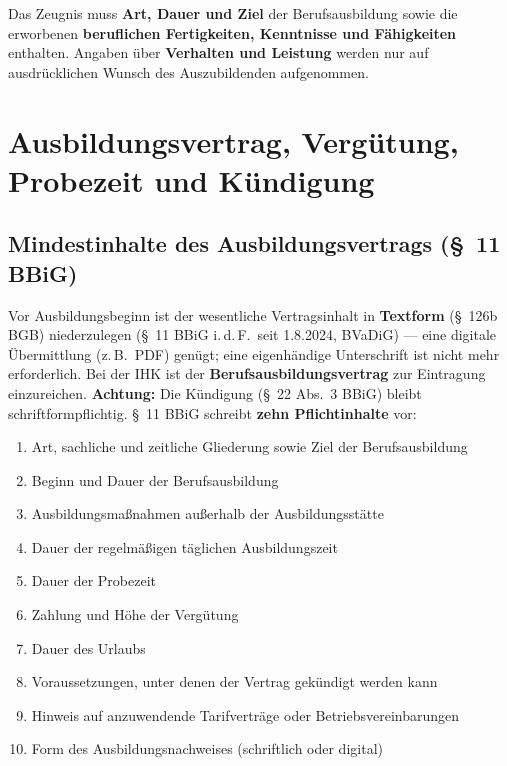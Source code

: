 \documentclass[11pt, a4paper]{article}
\begin{document}
\begin{merksatz}[title={\bfseries Wichtig: Ausbildungszeugnis nach \S~16 BBiG}]
Das Zeugnis muss \textbf{Art, Dauer und Ziel} der Berufsausbildung sowie die erworbenen
\textbf{beruflichen Fertigkeiten, Kenntnisse und Fähigkeiten} enthalten. Angaben über
\textbf{Verhalten und Leistung} werden nur auf ausdrücklichen Wunsch des Auszubildenden
aufgenommen.
\end{merksatz}

\section{Ausbildungsvertrag, Vergütung, Probezeit und Kündigung}

\subsection{Mindestinhalte des Ausbildungsvertrags (§~11 BBiG)}

Vor Ausbildungsbeginn ist der wesentliche Vertragsinhalt in \textbf{Textform} (§~126b BGB)
niederzulegen (§~11 BBiG i.\,d.\,F.\ seit 1.8.2024, BVaDiG) --- eine digitale Übermittlung
(z.\,B.\ PDF) genügt; eine eigenhändige Unterschrift ist nicht mehr erforderlich. Bei der IHK
ist der \textbf{Berufsausbildungsvertrag} zur Eintragung einzureichen. \textbf{Achtung:} Die
Kündigung (§~22 Abs.~3 BBiG) bleibt schriftformpflichtig.
§~11 BBiG schreibt \textbf{zehn Pflichtinhalte} vor:

\begin{enumerate}
  \item Art, sachliche und zeitliche Gliederung sowie Ziel der Berufsausbildung
  \item Beginn und Dauer der Berufsausbildung
  \item Ausbildungsmaßnahmen außerhalb der Ausbildungsstätte
  \item Dauer der regelmäßigen täglichen Ausbildungszeit
  \item Dauer der Probezeit
  \item Zahlung und Höhe der Vergütung
  \item Dauer des Urlaubs
  \item Voraussetzungen, unter denen der Vertrag gekündigt werden kann
  \item Hinweis auf anzuwendende Tarifverträge oder Betriebsvereinbarungen
  \item Form des Ausbildungsnachweises (schriftlich oder digital)
\end{enumerate}
\end{document}
